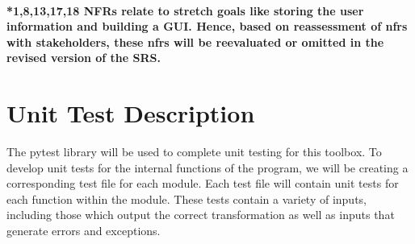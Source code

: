 \documentclass[12pt, titlepage]{article}
\begin{document}
\paragraph{*1,8,13,17,18 NFRs relate to stretch goals like storing the user information and building a GUI. Hence, based on reassessment of nfrs with stakeholders, these nfrs will be reevaluated or omitted in the revised version of the SRS.}
\begin{table}[H]
\centering
{}
\caption{Traceability Matrix Showing the Connections Between Non Functional Requirements and their test.}
\label{Table:trace}
\end{table}


\section{Unit Test Description}

The pytest library will be used to complete unit testing for this toolbox. To develop unit tests for the internal functions of the program, we will be creating a corresponding test file for each module. Each test file will contain unit tests for each function within the module. These tests contain a variety of inputs, including those which output the correct transformation as well as inputs that generate errors and exceptions. \\
\end{document}
